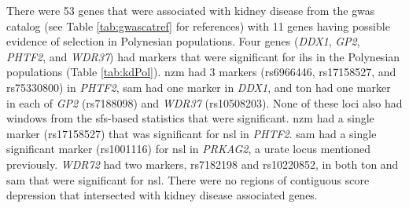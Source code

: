 \documentclass[twoside,openright]{report}
\begin{document}
There were 53 genes that were associated with kidney disease from the
\gls{gwas} catalog (see Table \ref{tab:gwascatref} for references) with
11 genes having possible evidence of selection in Polynesian
populations. Four genes (\emph{DDX1}, \emph{GP2}, \emph{PHTF2}, and
\emph{WDR37}) had markers that were significant for \gls{ihs} in the
Polynesian populations (Table \ref{tab:kdPol}). \Gls{nzm} had 3 markers
(rs6966446, rs17158527, and rs75330800) in \emph{PHTF2}, \gls{sam} had
one marker in \emph{DDX1}, and \gls{ton} had one marker in each of
\emph{GP2} (rs7188098) and \emph{WDR37} (rs10508203). None of these loci
also had windows from the \gls{sfs}-based statistics that were
significant. \Gls{nzm} had a single marker (rs17158527) that was
significant for \gls{nsl} in \emph{PHTF2}. \Gls{sam} had a single
significant marker (rs1001116) for \gls{nsl} in \emph{PRKAG2}, a urate
locus mentioned previously. \emph{WDR72} had two markers, rs7182198 and
rs10220852, in both \gls{ton} and \gls{sam} that were significant for
\gls{nsl}. There were no regions of contiguous score depression that
intersected with kidney disease associated genes.

\begingroup\fontsize{8}{10}\selectfont
\end{document}
